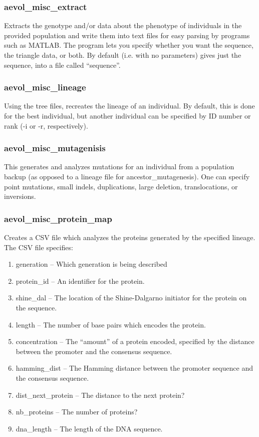 \subsubsection{aevol\_misc\_extract}

Extracts the genotype and/or data about the phenotype of individuals in the provided population and write them into text files for easy parsing by programs such as MATLAB. The program lets you specify whether you want the sequence, the triangle data, or both. By default (i.e. with no parameters) gives just the sequence, into a file called “sequence”.

\subsubsection{aevol\_misc\_lineage}

Using the tree files, recreates the lineage of an individual. By default, this is done for the best individual, but another individual can be specified by ID number or rank (-i or -r, respectively). 

\subsubsection{aevol\_misc\_mutagenisis}

This generates and analyzes mutations for an individual from a population backup (as opposed to a lineage file for ancestor\_mutagenesis). One can specify point mutations, small indels, duplications, large deletion, translocations, or inversions. 

\subsubsection{aevol\_misc\_protein\_map}

Creates a CSV file which analyzes the proteins generated by the specified lineage. The CSV file specifies:
\begin{enumerate}
	\item generation – Which generation is being described
	\item protein\_id – An identifier for the protein.
	\item shine\_dal – The location of the Shine-Dalgarno initiator for the protein
	 on the sequence.
	\item length – The number of base pairs which encodes the protein.
	\item concentration – The “amount” of a protein encoded, specified by the distance between the promoter and the consensus sequence. 
	\item hamming\_dist – The Hamming distance between the promoter sequence and the consensus sequence.
	\item dist\_next\_protein – The distance to the next protein?
	\item nb\_proteins – The number of proteins?
	\item dna\_length – The length of the DNA sequence.
\end{enumerate}



